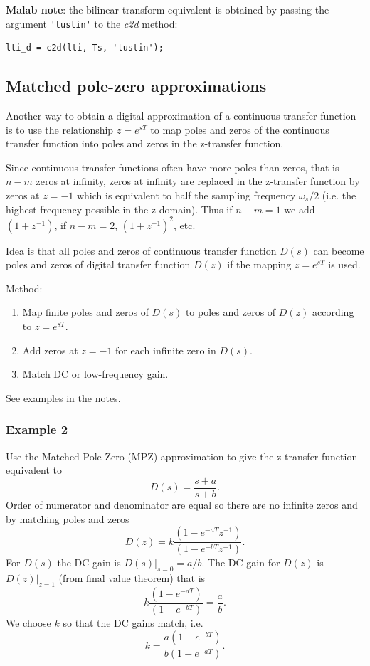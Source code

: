 \textbf{Malab note}: the bilinear transform equivalent is obtained by passing the argument \verb|'tustin'| to the \emph{c2d} method:
\begin{verbatim}
lti_d = c2d(lti, Ts, 'tustin');
\end{verbatim}

\subsection*{Matched pole-zero approximations}

Another way to obtain a digital approximation of a continuous transfer function is to use the relationship $z = e^{sT}$ to map poles and zeros of the continuous transfer function into poles and zeros in the z-transfer function.

Since continuous transfer functions often have more poles than zeros, that is $n-m$ zeros at infinity, zeros at infinity are replaced in the z-transfer function by zeros at $z = -1$ which is equivalent to half the sampling frequency $\omega_s/2$ (i.e. the highest frequency possible in the z-domain). Thus if $n-m =1$ we add $(1+z^{-1})$, if $n-m=2$, $(1+z^{-1})^2$, etc.

\begin{slide}\label{slides:l11s24}
	Idea is that all poles and zeros of continuous transfer function $D(s)$ can become poles and zeros of digital transfer function $D(z)$ if the mapping $z=e^{sT}$ is used.

	Method:
	\begin{enumerate}
		\item Map finite poles and zeros of $D(s)$ to poles and zeros of $D(z)$ according to $z=e^{sT}$.
		\item Add zeros at $z=-1$ for each infinite zero in $D(s)$.
		\item Match DC or low-frequency gain.
	\end{enumerate}
	See examples in the notes.
\end{slide}

\subsubsection*{Example 2}

Use the Matched-Pole-Zero (MPZ) approximation to give the z-transfer function equivalent to
$$D(s)=\frac{s+a}{s+b}.$$ Order of numerator and denominator are equal so there are no infinite zeros and by matching poles and zeros  $$D(z)=k\frac{(1-e^{-aT}z^{-1})}{(1 - e^{-bT}z^{-1})}.$$ For $D(s)$ the DC gain is $D(s)|_{s=0} = a/b$. The DC gain for $D(z)$ is $D(z)|_{z=1}$ (from final value theorem) that is $$k\frac{(1-e^{-aT})}{(1-e^{-bT})} = \frac{a}{b}.$$ We choose $k$ so that the DC gains match, i.e. $$k=\frac{a(1-e^{-bT})}{b(1-e^{-aT})}.$$

